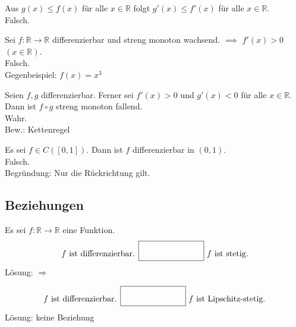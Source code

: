 Aus $g(x) \leq f(x)$ für alle $x \in \mathbb{R}$ folgt $g'(x) \leq f'(x)$ für alle $x \in \mathbb{R}$.\\
Falsch.

Sei $f: \mathbb{R} \to \mathbb{R}$ differenzierbar und streng monoton wachsend. $\implies$ $f'(x) > 0$ $(x \in \mathbb{R})$.\\
Falsch.\\
Gegenbeispiel: $f(x) = x^3$

Seien $f,g$ differenzierbar.
Ferner sei $f'(x) > 0$ und $g'(x) < 0$ für alle $x \in \mathbb{R}$.
Dann ist $f \circ g$ streng monoton fallend.\\
Wahr.\\
Bew.: Kettenregel

Es sei $f \in C([0,1])$.
Dann ist $f$ differenzierbar in $(0,1)$.\\
Falsch.\\
Begründung: Nur die Rückrichtung gilt.

\subsection{Beziehungen}
Es sei $f: \mathbb{R} \to \mathbb{R}$ eine Funktion.
\begin{displaymath}
  f \text{ ist differenzierbar. } \fbox{\rule{1in}{0pt}\rule[-0.5ex]{0pt}{4ex}} \text{ $f$ ist stetig.}
\end{displaymath}
Lösung: $\Rightarrow$

\begin{displaymath}
  f \text{ ist differenzierbar. } \fbox{\rule{1in}{0pt}\rule[-0.5ex]{0pt}{4ex}} \text{ $f$ ist Lipschitz-stetig.}
\end{displaymath}
Lösung: keine Beziehung